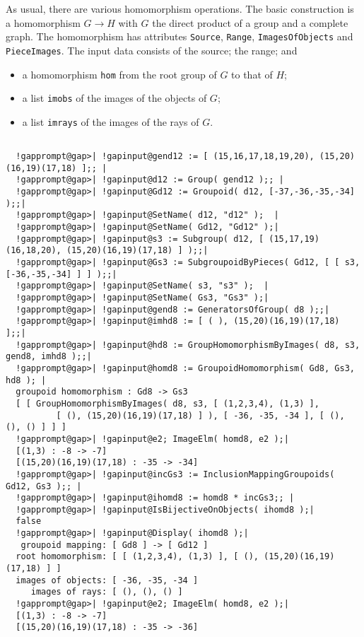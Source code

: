 \documentclass[a4paper,11pt]{report}
\begin{document}
{{{ As usual, there are various homomorphism operations. The basic construction is
a homomorphism $G \to H$ with $G$ the direct product of a group and a complete graph. The homomorphism has
attributes \texttt{Source}, \texttt{Range}, \texttt{ImagesOfObjects} and \texttt{PieceImages}. The input data consists of the source; the range; and 
\begin{itemize}
\item  a homomorphism \texttt{hom} from the root group of $G$ to that of $H$; 
\item  a list \texttt{imobs} of the images of the objects of $G$; 
\item  a list \texttt{imrays} of the images of the rays of $G$. 
\end{itemize}
 

 }

 
\begin{Verbatim}[commandchars=!@|,fontsize=\small,frame=single,label=Example]
  
  !gapprompt@gap>| !gapinput@gend12 := [ (15,16,17,18,19,20), (15,20)(16,19)(17,18) ];; |
  !gapprompt@gap>| !gapinput@d12 := Group( gend12 );; |
  !gapprompt@gap>| !gapinput@Gd12 := Groupoid( d12, [-37,-36,-35,-34] );;|
  !gapprompt@gap>| !gapinput@SetName( d12, "d12" );  |
  !gapprompt@gap>| !gapinput@SetName( Gd12, "Gd12" );|
  !gapprompt@gap>| !gapinput@s3 := Subgroup( d12, [ (15,17,19)(16,18,20), (15,20)(16,19)(17,18) ] );;|
  !gapprompt@gap>| !gapinput@Gs3 := SubgroupoidByPieces( Gd12, [ [ s3, [-36,-35,-34] ] ] );;|
  !gapprompt@gap>| !gapinput@SetName( s3, "s3" );  |
  !gapprompt@gap>| !gapinput@SetName( Gs3, "Gs3" );|
  !gapprompt@gap>| !gapinput@gend8 := GeneratorsOfGroup( d8 );;|
  !gapprompt@gap>| !gapinput@imhd8 := [ ( ), (15,20)(16,19)(17,18) ];;|
  !gapprompt@gap>| !gapinput@hd8 := GroupHomomorphismByImages( d8, s3, gend8, imhd8 );;|
  !gapprompt@gap>| !gapinput@homd8 := GroupoidHomomorphism( Gd8, Gs3, hd8 ); |
  groupoid homomorphism : Gd8 -> Gs3
  [ [ GroupHomomorphismByImages( d8, s3, [ (1,2,3,4), (1,3) ], 
          [ (), (15,20)(16,19)(17,18) ] ), [ -36, -35, -34 ], [ (), (), () ] ] ]
  !gapprompt@gap>| !gapinput@e2; ImageElm( homd8, e2 );|
  [(1,3) : -8 -> -7]
  [(15,20)(16,19)(17,18) : -35 -> -34]
  !gapprompt@gap>| !gapinput@incGs3 := InclusionMappingGroupoids( Gd12, Gs3 );; |
  !gapprompt@gap>| !gapinput@ihomd8 := homd8 * incGs3;; |
  !gapprompt@gap>| !gapinput@IsBijectiveOnObjects( ihomd8 );|
  false
  !gapprompt@gap>| !gapinput@Display( ihomd8 );|
   groupoid mapping: [ Gd8 ] -> [ Gd12 ]
  root homomorphism: [ [ (1,2,3,4), (1,3) ], [ (), (15,20)(16,19)(17,18) ] ]
  images of objects: [ -36, -35, -34 ]
     images of rays: [ (), (), () ]
  !gapprompt@gap>| !gapinput@e2; ImageElm( homd8, e2 );|
  [(1,3) : -8 -> -7]
  [(15,20)(16,19)(17,18) : -35 -> -36]
  

\end{Verbatim}}}
\end{document}
